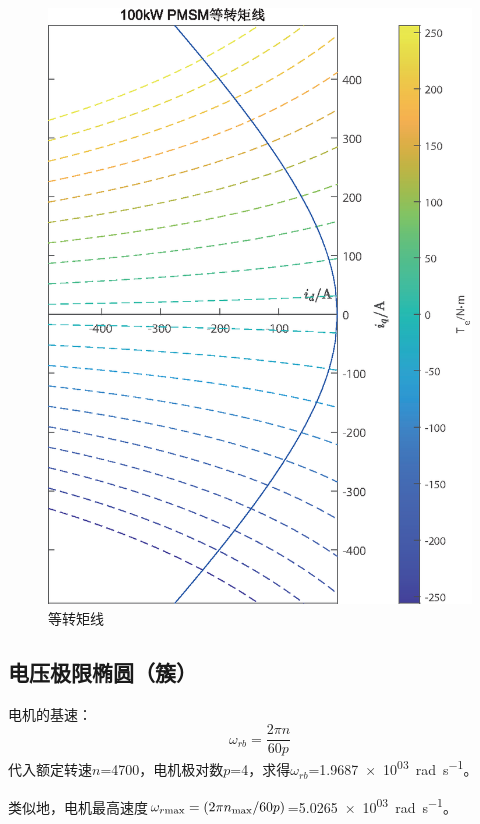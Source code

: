 \documentclass[UTF8]{ctexart}
\numberwithin{figure}{section}
\numberwithin{table}{section}
\begin{document}
\begin{figure}[htbp]
\begin{minipage}[b]{0.8\textwidth}
		\includegraphics[width=\textwidth]{2}
		\caption{等转矩线}
		\label{equtque}
	\end{minipage}
\end{figure}

\subsection{电压极限椭圆（簇）}
\label{subsection:2.3}

电机的基速\cite{b}：
\begin{equation}
	\omega_{rb}=\frac{2\pi n}{60p}\label{omega_rb}
\end{equation}
代入额定转速$n$=\SI{4700}{\rpm}，电机极对数$p$=4，求得$\omega_{rb}$=\SI[round-mode=places,round-precision=2,inter-unit-product=\ensuremath{\cdot}]{1.9687e+03}{\radian\per\second}。

类似地，电机最高速度$\omega_{r\rm max}=(2\pi n_{\rm max}/60p)$=\SI[round-mode=places,round-precision=2,inter-unit-product=\ensuremath{\cdot}]{5.0265e+03}{\radian\per\second}。
\end{document}
